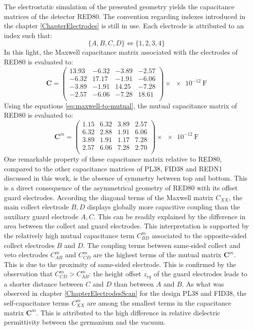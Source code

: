 The electrostatic simulation of the presented geometry yields the capacitance matrices  of the detector RED80. The convention regarding indexes introduced in the chapter \ref{ChapterElectrodes} is still in use. Each electrode is attributed to an index such that:
\begin{equation}
\label{eq:indexes-convention}
\{ A, B, C, D \} \Leftrightarrow \{ 1, 2, 3, 4 \}
\end{equation}
In this light, the Maxwell capacitance matrix associated with the electrodes of RED80 is evaluated to:
\begin{equation}
\label{eq:redn1-maxwell}
\bm{C} = 
\begin{pmatrix}
  13.93 & -6.32 & -3.89 & -2.57\\
  -6.32 & 17.17 & -1.91 & -6.06\\
  -3.89 & -1.91 & 14.25 & -7.28\\
  -2.57 & -6.06 & -7.28 & 18.61\\
\end{pmatrix}
\times \SI{e-12}{\farad}
\end{equation}
Using the equations \ref{eq:maxwell-to-mutual}, the mutual capacitance matrix of RED80 is evaluated to:
\begin{equation}
\label{eq:redn1-mutual}
\bm{C}^m = 
\begin{pmatrix}
  1.15 & 6.32 & 3.89 & 2.57\\
  6.32 & 2.88 & 1.91 & 6.06\\
  3.89 & 1.91 & 1.17 & 7.28\\
  2.57 & 6.06 & 7.28 & 2.70\\
\end{pmatrix}
\times \SI{e-12}{\farad}
\end{equation}
One remarkable property of these capacitance matrix relative to RED80, compared to the other capacitance matrices of PL38, FID38 and REDN1 discussed in this work, is the absence of symmetry between top and bottom. This is a direct consequence of the asymmetrical geometry of RED80 with its offset guard electrodes.  
According the diagonal terms of the Maxwell matrix $C_{XX}$, the main collect electrode $B,D$ displays globally more capacitive coupling than the auxiliary guard electrode $A,C$. This can be readily explained by the difference in area between the collect and guard electrodes. This interpretation is supported by the relatively high mutual capacitance term $C_{BD}^m$ associated to the opposite-sided collect electrodes $B$ and $D$. 
The coupling terms between same-sided collect and veto electrodes $C_{AB}^m$ and  $C_{CD}^m$ are the highest terms of the mutual matrix $\bm{C}^m$. This is due to the proximity of same-sided electrode. This is confirmed by the observation that $C_{CD}^m > C_{AB}^m$: the height offset $z_{eq}$ of the guard electrodes leads to a shorter 
distance between $C$ and $D$ than between $A$ and $B$.
As what was observed in chapter \ref{ChapterElectrodesScan} for the design PL38 and FID38, the self-capacitance terms $C_{XX}^m$ are among the smallest terms in the capacitance matrix $\bm{C}^m$. This is attributed to the high difference in relative dielectric permittivity between the germanium and the vacuum.

